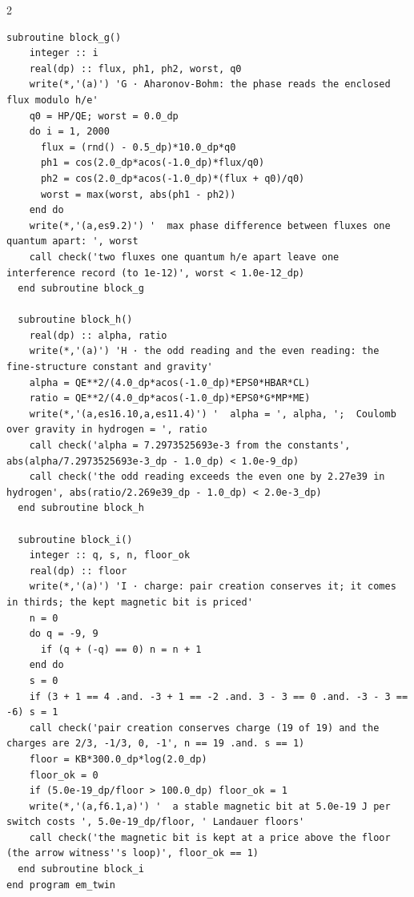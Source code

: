 \documentclass[10pt]{article}
\begin{document}
\begin{multicols}{2}
\begin{Verbatim}[fontsize=\fontsize{6.0}{6.9}\selectfont,breaklines,breakanywhere,breaksymbolleft={}]
  subroutine block_g()
    integer :: i
    real(dp) :: flux, ph1, ph2, worst, q0
    write(*,'(a)') 'G · Aharonov-Bohm: the phase reads the enclosed flux modulo h/e'
    q0 = HP/QE; worst = 0.0_dp
    do i = 1, 2000
      flux = (rnd() - 0.5_dp)*10.0_dp*q0
      ph1 = cos(2.0_dp*acos(-1.0_dp)*flux/q0)
      ph2 = cos(2.0_dp*acos(-1.0_dp)*(flux + q0)/q0)
      worst = max(worst, abs(ph1 - ph2))
    end do
    write(*,'(a,es9.2)') '  max phase difference between fluxes one quantum apart: ', worst
    call check('two fluxes one quantum h/e apart leave one interference record (to 1e-12)', worst < 1.0e-12_dp)
  end subroutine block_g

  subroutine block_h()
    real(dp) :: alpha, ratio
    write(*,'(a)') 'H · the odd reading and the even reading: the fine-structure constant and gravity'
    alpha = QE**2/(4.0_dp*acos(-1.0_dp)*EPS0*HBAR*CL)
    ratio = QE**2/(4.0_dp*acos(-1.0_dp)*EPS0*G*MP*ME)
    write(*,'(a,es16.10,a,es11.4)') '  alpha = ', alpha, ';  Coulomb over gravity in hydrogen = ', ratio
    call check('alpha = 7.2973525693e-3 from the constants', abs(alpha/7.2973525693e-3_dp - 1.0_dp) < 1.0e-9_dp)
    call check('the odd reading exceeds the even one by 2.27e39 in hydrogen', abs(ratio/2.269e39_dp - 1.0_dp) < 2.0e-3_dp)
  end subroutine block_h

  subroutine block_i()
    integer :: q, s, n, floor_ok
    real(dp) :: floor
    write(*,'(a)') 'I · charge: pair creation conserves it; it comes in thirds; the kept magnetic bit is priced'
    n = 0
    do q = -9, 9
      if (q + (-q) == 0) n = n + 1
    end do
    s = 0
    if (3 + 1 == 4 .and. -3 + 1 == -2 .and. 3 - 3 == 0 .and. -3 - 3 == -6) s = 1
    call check('pair creation conserves charge (19 of 19) and the charges are 2/3, -1/3, 0, -1', n == 19 .and. s == 1)
    floor = KB*300.0_dp*log(2.0_dp)
    floor_ok = 0
    if (5.0e-19_dp/floor > 100.0_dp) floor_ok = 1
    write(*,'(a,f6.1,a)') '  a stable magnetic bit at 5.0e-19 J per switch costs ', 5.0e-19_dp/floor, ' Landauer floors'
    call check('the magnetic bit is kept at a price above the floor (the arrow witness''s loop)', floor_ok == 1)
  end subroutine block_i
end program em_twin
\end{Verbatim}
\end{multicols}
\end{document}
